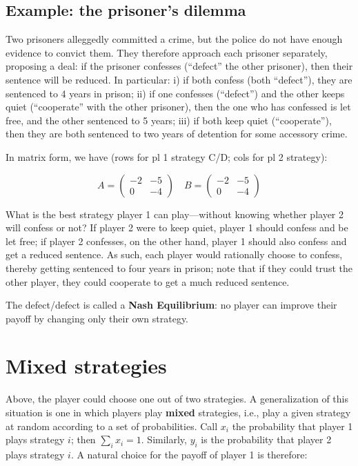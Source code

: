 \documentclass[
]{book}
\begin{document}
\hypertarget{example-the-prisoners-dilemma}{%
\subsection{Example: the prisoner's dilemma}\label{example-the-prisoners-dilemma}}

Two prisoners alleggedly committed a crime, but the police do not have enough evidence to convict them. They therefore approach each prisoner separately, proposing a deal: if the prisoner confesses (``defect'' the other prisoner), then their sentence will be reduced. In particular: i) if both confess (both ``defect''), they are sentenced to 4 years in prison; ii) if one confesses (``defect'') and the other keeps quiet (``cooperate'' with the other prisoner), then the one who has confessed is let free, and the other sentenced to 5 years; iii) if both keep quiet (``cooperate''), then they are both sentenced to two years of detention for some accessory crime.

In matrix form, we have (rows for pl 1 strategy C/D; cols for pl 2 strategy):

\[
A = \begin{pmatrix}
-2 & -5\\
0 & -4
\end{pmatrix} \quad
B = \begin{pmatrix}
-2 & -5\\
0 & -4
\end{pmatrix}
\]

What is the best strategy player 1 can play---without knowing whether player 2 will confess or not? If player 2 were to keep quiet, player 1 should confess and be let free; if player 2 confesses, on the other hand, player 1 should also confess and get a reduced sentence. As such, each player would rationally choose to confess, thereby getting sentenced to four years in prison; note that if they could trust the other player, they could cooperate to get a much reduced sentence.

The defect/defect is called a \textbf{Nash Equilibrium}: no player can improve their payoff by changing only their own strategy.

\hypertarget{mixed-strategies}{%
\section{Mixed strategies}\label{mixed-strategies}}

Above, the player could choose one out of two strategies. A generalization of this situation is one in which players play \textbf{mixed} strategies, i.e., play a given strategy at random according to a set of probabilities. Call \(x_i\) the probability that player 1 plays strategy \(i\); then \(\sum_i x_i = 1\). Similarly, \(y_i\) is the probability that player 2 plays strategy \(i\). A natural choice for the payoff of player 1 is therefore:
\end{document}
